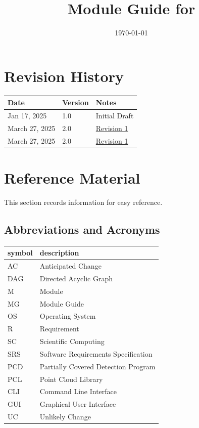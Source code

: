 \documentclass[12pt, titlepage]{article}
\begin{document}
\title{Module Guide for \progname{}} 
\author{\authname}
\date{\today}

\maketitle


\section{Revision History}

\begin{tabularx}{\textwidth}{p{3cm}p{2cm}X}
\toprule {\bf Date} & {\bf Version} & {\bf Notes}\\
\midrule
Jan 17, 2025 & 1.0 & Initial Draft\\
March 27, 2025 & 2.0 & \href{https://github.com/takhtart/PCD/issues/104}{Revision 1}\\
March 27, 2025 & 2.0 & \href{https://github.com/takhtart/PCD/issues/105}{Revision 1}\\
\bottomrule
\end{tabularx}

\newpage

\section{Reference Material}

This section records information for easy reference.

\subsection{Abbreviations and Acronyms}

\renewcommand{\arraystretch}{1.2}
\begin{tabular}{l l} 
  \toprule		
  \textbf{symbol} & \textbf{description}\\
  \midrule 
  AC & Anticipated Change\\
  DAG & Directed Acyclic Graph \\
  M & Module \\
  MG & Module Guide \\
  OS & Operating System \\
  R & Requirement\\
  SC & Scientific Computing \\
  SRS & Software Requirements Specification\\
  PCD & Partially Covered Detection Program \\
  PCL & Point Cloud Library \\
  CLI & Command Line Interface \\
  GUI & Graphical User Interface \\
  UC & Unlikely Change \\

  \bottomrule
\end{tabular}\\
\end{document}
